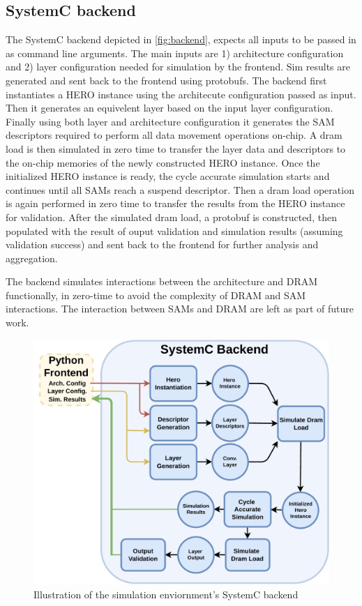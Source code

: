 \subsection{SystemC backend}
\label{chap:hero:sim_platform:backend}

The SystemC backend depicted in \autoref{fig:backend}, expects all inputs to be passed in as command line
arguments. The main inputs are 1) architecture configuration and 2) layer
configuration needed for simulation by the frontend. Sim results are generated
and sent back to the frontend using protobufs. The backend first instantiates a
HERO instance using the architecute configuration passed as input. Then it
generates an equivelent layer based on the input layer configuration. Finally
using both layer and architecture configuration it generates the SAM descriptors
required to perform all data movement operations on-chip. A dram load is then
simulated in zero time to transfer the layer data and descriptors to the on-chip
memories of the newly constructed HERO instance. Once the initialized HERO
instance is ready, the cycle accurate simulation starts and continues until all
SAMs reach a suspend descriptor. Then a dram load operation is again performed
in zero time to transfer the results from the HERO instance for validation.
After the simulated dram load, a protobuf is constructed, then populated with
the result of ouput validation and simulation results (assuming validation
success) and sent back to the frontend for further analysis and aggregation. 

The backend simulates interactions between the architecture and DRAM
functionally, in zero-time to avoid the complexity of DRAM and SAM interactions.
The interaction between SAMs and DRAM are left as part of future work. 

\begin{figure}[ht]
    \centering
    \includegraphics[scale=0.5]{fig/hero-sim-backend.pdf}
    \caption{Illustration of the simulation enviornment's SystemC backend}
    \label{fig:backend}
\end{figure}


